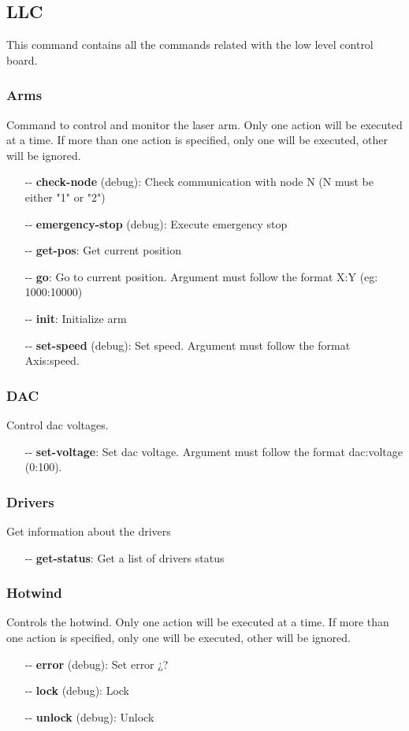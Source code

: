 \documentclass[letterpaper, 10 pt]{article}
\begin{document}
\subsection{LLC}
This command contains all the commands related with the low level control board.
\subsubsection{Arms}
Command to control and monitor the laser arm. Only one action will be executed at a time. If more than one action is specified, only one will be executed, other will be ignored.
\begin{itemize}
	\item[-{}-] \textbf{check-node} (debug): Check communication with node N (N must be either "1" or "2")
	\item[-{}-] \textbf{emergency-stop} (debug): Execute emergency stop
	\item[-{}-] \textbf{get-pos}: Get current position
	\item[-{}-] \textbf{go}: Go to current position. Argument must follow the format X:Y (eg: 1000:10000)
	\item[-{}-] \textbf{init}: Initialize arm
	\item[-{}-] \textbf{set-speed} (debug): Set speed. Argument must follow the format Axis:speed.
\end{itemize}
\subsubsection{DAC}
Control dac voltages.
\begin{itemize}
	\item[-{}-] \textbf{set-voltage}: Set dac voltage. Argument must follow the format dac:voltage (0:100).
\end{itemize}

\subsubsection{Drivers}
Get information about the drivers
\begin{itemize}
	\item[-{}-] \textbf{get-status}: Get a list of drivers status
\end{itemize}

\subsubsection{Hotwind}
Controls the hotwind. Only one action will be executed at a time. If more than one action is specified, only one will be executed, other will be ignored.
\begin{itemize}
	\item[-{}-] \textbf{error} (debug): Set error ¿?
	\item[-{}-] \textbf{lock} (debug): Lock
	\item[-{}-] \textbf{unlock} (debug): Unlock
\end{itemize}
\end{document}
